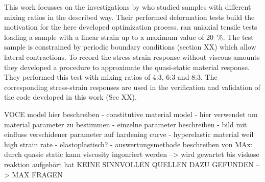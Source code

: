 





This work focusses on the investigations by \citet{ries_deciphering_nodate} who studied samples with different mixing ratios in the described way. Their performed deformation tests build the motivation for the here developed optimization process. \citet{ries_deciphering_nodate} ran uniaxial tensile tests loading a sample with a linear strain up to a maximum value of 20 \%. The test sample is constrained by periodic boundary conditions (section XX) which allow lateral contractions. To record the stress-strain response without viscous amounts they developed a procedure to approximate the quasi-static material response. They performed this test with mixing ratios of 4:3, 6:3 and 8:3. The corresponding stress-strain responses are used in the verification and validation of the code developed in this work (Sec XX). 

VOCE model hier beschreiben
- constitutive material model
- hier verwendet um material parameter zu bestimmen
- einzelne parameter beschreiben
- bild mit einfluss verschidener parameter auf hardening curve 
- hyperelastic material weil high strain rate 
- elastoplastisch? 
- auswertungsmethode beschreiben von MAx: durch quasie static kann viscosity ingonriert werden --> wird gewartet bis viskose reaktion aufgehört hat
 KEINE SINNVOLLEN QUELLEN DAZU GEFUNDEN --> MAX FRAGEN  






